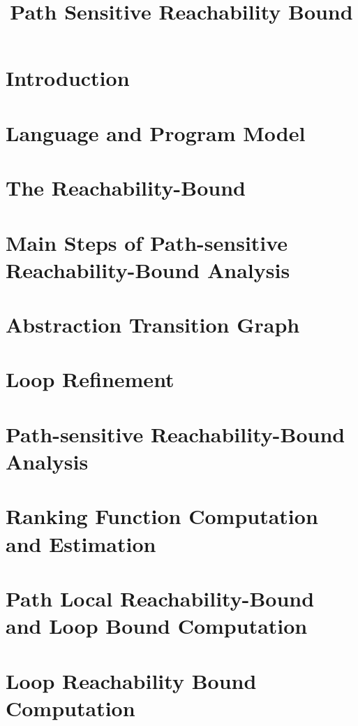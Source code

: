 \documentclass[a4paper,11pt]{article}
\begin{document}
\title{Path Sensitive Reachability Bound}

\author{}

\date{}

\maketitle
%
\tableofcontents


\section{Introduction}
\section{{Language and Program Model}}
\label{sec:language}

\section{{The Reachability-Bound}}
\label{sec:execution_rb}

\section{Main Steps of Path-sensitive Reachability-Bound Analysis}
\label{sec:static_rb}

\section{Abstraction Transition Graph}
\label{sec:progabs}

\section{Loop Refinement}
\label{sec:refine}

\section{Path-sensitive Reachability-Bound Analysis}
\label{sec:psrb}

\section{Ranking Function Computation and Estimation}
\label{sec:rank}

\section{Path Local Reachability-Bound and Loop Bound Computation}
\label{sec:pathlocalrb}

\section{Loop Reachability Bound Computation}
\label{sec:looprb}

\end{document}
